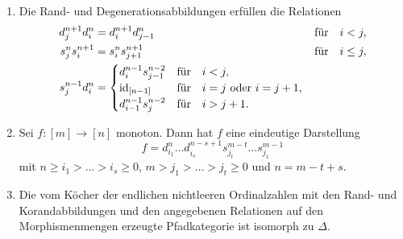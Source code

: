 \begin{lemma}[\cite{GM}, I.2, ex. 1] \label{face-gen}
  \begin{enumerate}[label=(\roman*)] \item \label{itm:face-gen-rel}
    Die Rand- und Degenerationsabbildungen er\-fül\-len die Relationen
    \begin{alignat*}{2}
      d_j^{n+1} d_i^n &= d_i^{n+1} d_{j-1}^n \qquad &&\text{für} \quad i < j, \\
      s_j^n s_i^{n+1} &= s_i^n s_{j+1}^{n+1} &&\text{für} \quad i \leq j, \\
      s_j^{n-1} d_i^n &=
      \begin{cases}
        d_i^{n-1} s_{j-1}^{n-2} & \text{für} \quad i < j, \\
        \operatorname{id}_{[n-1]} & \text{für} \quad i = j \text{ oder } i = j+1, \\
        d_{i-1}^{n-1} s_j^{n-2} & \text{für} \quad i > j + 1.
    \end{cases}
  \end{alignat*}
   \item \label{itm:face-gen-form} Sei $f: [m] \to [n]$ monoton. Dann
     hat $f$ eine eindeutige Darstellung
  \[ f = d_{i_1}^n \dots d_{i_s}^{n-s+1} s_{j_t}^{m-t} \dots s_{j_1}^{m-1} \]
  mit $n \geq i_1 > \dots > i_s \geq 0$, $m > j_1 > \dots > j_t \geq
  0$ und $n = m-t+s$.
\item \label{itm:face-gen-cat} Die vom Köcher der endlichen
  nichtleeren Ordinalzahlen mit den Rand- und Korandabbildungen und
  den angegebenen Relationen auf den Morphismenmengen erzeugte
  Pfadkategorie ist isomorph zu $\Delta$.
  \end{enumerate}
\end{lemma}
